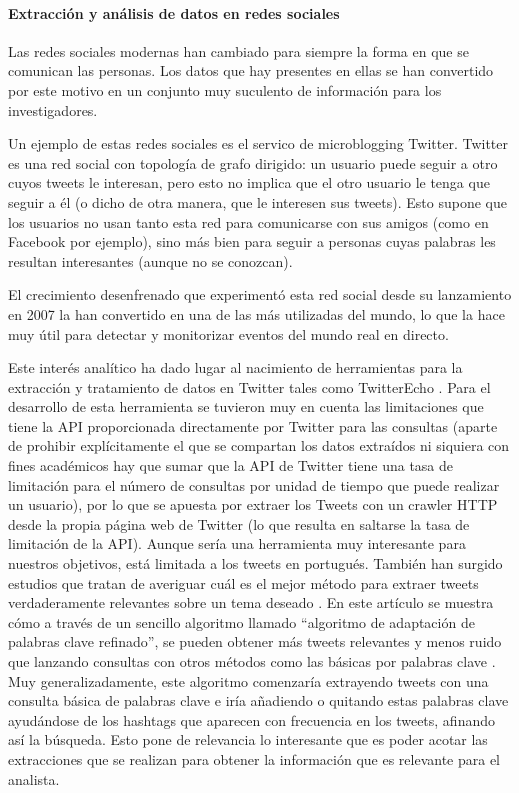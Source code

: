 \paragraph{Extracción y análisis de datos en redes sociales}
Las redes sociales modernas han cambiado para siempre la forma en que se comunican las personas. Los datos que hay presentes en ellas se han convertido por este motivo en un conjunto muy suculento de información para los investigadores. 

Un ejemplo de estas redes sociales es el servico de microblogging Twitter. Twitter es una red social con topología de grafo dirigido: un usuario puede seguir a otro cuyos tweets le interesan, pero esto no implica que el otro usuario le tenga que seguir a él (o dicho de otra manera, que le interesen sus tweets). Esto supone que los usuarios no usan tanto esta red para comunicarse con  sus amigos (como en Facebook por ejemplo), sino más bien para seguir a personas cuyas palabras les resultan interesantes (aunque no se conozcan).

El crecimiento desenfrenado que experimentó esta red social desde su lanzamiento en 2007 la han convertido en una de las más utilizadas del mundo, lo que la hace muy útil para detectar y monitorizar eventos del mundo real en directo.

Este interés analítico ha dado lugar al nacimiento de herramientas para la extracción y tratamiento de datos en Twitter tales como TwitterEcho \cite{Bosnjak2012}. Para el desarrollo de esta herramienta se tuvieron muy en cuenta las limitaciones que tiene la API proporcionada directamente por Twitter para las consultas (aparte de prohibir explícitamente el que se compartan los datos extraídos ni siquiera con fines académicos hay que sumar que la API de Twitter tiene una tasa de limitación para el número de consultas por unidad de tiempo que puede realizar un usuario), por lo que se apuesta por extraer los Tweets con un crawler HTTP desde la propia página web de Twitter (lo que resulta en saltarse la tasa de limitación de la API). Aunque sería una herramienta muy interesante para nuestros objetivos, está limitada a los tweets en portugués.
\newpage
También han surgido estudios que tratan de averiguar cuál es el mejor método para extraer tweets verdaderamente relevantes sobre un tema deseado \cite{Criado2013}. En este artículo se muestra cómo a través de un sencillo algoritmo llamado ``algoritmo de adaptación de palabras clave refinado'', se pueden obtener más tweets relevantes y menos ruido que lanzando consultas con otros métodos como las básicas por palabras clave . Muy generalizadamente, este algoritmo comenzaría extrayendo tweets con una consulta básica de palabras clave e iría añadiendo o quitando estas palabras clave ayudándose de los hashtags que aparecen con frecuencia en los tweets, afinando así la búsqueda. Esto pone de relevancia lo interesante que es poder acotar las extracciones que se realizan para obtener la información que es relevante para el analista.


